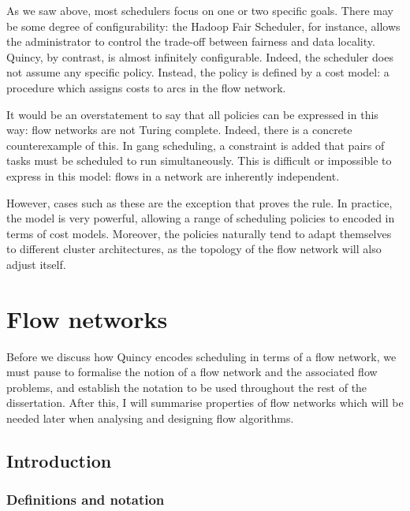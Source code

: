 As we saw above, most schedulers focus on one or two specific goals. There may be some degree of configurability: the Hadoop Fair Scheduler, for instance, allows the administrator to control the trade-off between fairness and data locality. Quincy, by contrast, is almost infinitely configurable. Indeed, the scheduler does not assume any specific policy. Instead, the policy is defined by a cost model: a procedure which assigns costs to arcs in the flow network.

It would be an overstatement to say that all policies can be expressed in this way: flow networks are not Turing complete. Indeed, there is a concrete counterexample of this. In gang scheduling\footnotemark, a constraint is added that pairs of tasks must be scheduled to run simultaneously. This is difficult or impossible to express in this model: flows in a network are inherently independent.

However, cases such as these are the exception that proves the rule. In practice, the model is very powerful, allowing a range of scheduling policies to encoded in terms of cost models. Moreover, the policies naturally tend to adapt themselves to different cluster architectures, as the topology of the flow network will also adjust itself.

\section{Flow networks} \label{prep-flow}

Before we discuss how Quincy encodes scheduling in terms of a flow network, we must pause to formalise the notion of a flow network and the associated flow problems, and establish the notation to be used throughout the rest of the dissertation. After this, I will summarise properties of flow networks which will be needed later when analysing and designing flow algorithms.

\subsection{Introduction}

\subsubsection{Definitions and notation}

